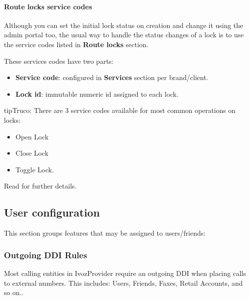 \documentclass[letterpaper,10pt,spanish]{sphinxmanual}
\begin{document}
\paragraph{Route locks service codes}
\label{administration_portal/client/vpbx/routing_tools/route_locks:route-locks-service-codes}
Although you can set the initial lock status on creation and change it using the admin portal too, the usual way to
handle the status changes of a lock is to use the service codes listed in \textbf{Route locks} section.

These services codes have two parts:
\begin{itemize}
\item {} 
\textbf{Service code}: configured in \textbf{Services} section per brand/client.

\item {} 
\textbf{Lock id}: immutable numeric id assigned to each lock.

\end{itemize}

\begin{notice}{tip}{Truco:}
There are 3 service codes available for most common operations on locks:
\begin{itemize}
\item {} 
Open Lock

\item {} 
Close Lock

\item {} 
Toggle Lock.

\end{itemize}

Read {\hyperref[administration_portal/client/vpbx/services:services]{}} for further details.
\end{notice}


\subsection{User configuration}
\label{administration_portal/client/vpbx/user_configuration/index:user-configuration}\label{administration_portal/client/vpbx/user_configuration/index::doc}
This section groups features that may be assigned to users/friends:


\subsubsection{Outgoing DDI Rules}
\label{administration_portal/client/vpbx/user_configuration/outgoing_ddi_rules:outgoing-ddi-rules}\label{administration_portal/client/vpbx/user_configuration/outgoing_ddi_rules:outgoingddi-rules}\label{administration_portal/client/vpbx/user_configuration/outgoing_ddi_rules::doc}
Most calling entities in IvozProvider require an outgoing DDI when placing calls
to external numbers. This includes: Users, Friends, Faxes, Retail Accounts, and
so on..
\end{document}
